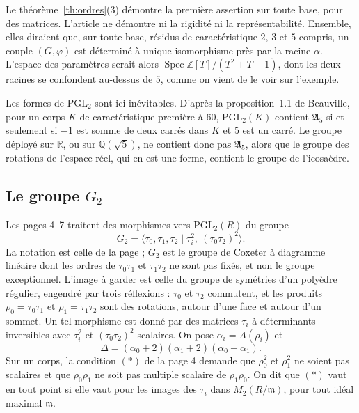 \documentclass[11pt,a4paper]{amsart}
\theoremstyle{definition}
\theoremstyle{plain}
\theoremstyle{remark}
\theoremstyle{plain}
\newcommand{\Z}{\mathbb Z}
\newcommand{\Q}{\mathbb Q}
\newcommand{\PGL}{\mathrm{PGL}_2}
\newcommand{\Spec}{\operatorname{Spec}}
\begin{document}
Le théorème~\ref{th:ordres}(3) démontre la première assertion sur toute base, pour des matrices. L'article ne démontre ni la rigidité ni la représentabilité. Ensemble, elles diraient que, sur toute base, résidus de caractéristique $2$, $3$ et $5$ compris, un couple $(G, \varphi)$ est déterminé à unique isomorphisme près par la racine $\alpha$. L'espace des paramètres serait alors $\Spec\Z[T]/(T^2 + T - 1)$, dont les deux racines se confondent au-dessus de $5$, comme on vient de le voir sur l'exemple.

Les formes de $\PGL$ sont ici inévitables. D'après la proposition~1.1 de Beauville, pour un corps $K$ de caractéristique première à $60$, $\PGL(K)$ contient $\mathfrak A_5$ si et seulement si $-1$ est somme de deux carrés dans $K$ et $5$ est un carré. Le groupe déployé sur $\mathbb R$, ou sur $\Q(\sqrt5)$, ne contient donc pas $\mathfrak A_5$, alors que le groupe des rotations de l'espace réel, qui en est une forme, contient le groupe de l'icosaèdre.

\subsection{Le groupe \texorpdfstring{$G_2$}{G2}}

Les pages 4--7 traitent des morphismes vers $\PGL(R)$ du groupe
\[
G_2 = \langle\tau_0, \tau_1, \tau_2 \mid \tau_i^2,\ (\tau_0\tau_2)^2\rangle.
\]
La notation est celle de la page ; $G_2$ est le groupe de Coxeter à diagramme linéaire dont les ordres de $\tau_0\tau_1$ et $\tau_1\tau_2$ ne sont pas fixés, et non le groupe exceptionnel. L'image à garder est celle du groupe de symétries d'un polyèdre régulier, engendré par trois réflexions : $\tau_0$ et $\tau_2$ commutent, et les produits $\rho_0 = \tau_0\tau_1$ et $\rho_1 = \tau_1\tau_2$ sont des rotations, autour d'une face et autour d'un sommet. Un tel morphisme est donné par des matrices $\tau_i$ à déterminants inversibles avec $\tau_i^2$ et $(\tau_0\tau_2)^2$ scalaires. On pose $\alpha_i = A(\rho_i)$ et
\[
\Delta = (\alpha_0 + 2)(\alpha_1 + 2)(\alpha_0 + \alpha_1).
\]
Sur un corps, la condition $(*)$ de la page 4 demande que $\rho_0^2$ et $\rho_1^2$ ne soient pas scalaires et que $\rho_0\rho_1$ ne soit pas multiple scalaire de $\rho_1\rho_0$. On dit que $(*)$ vaut en tout point si elle vaut pour les images des $\tau_i$ dans $M_2(R/\mathfrak m)$, pour tout idéal maximal $\mathfrak m$.
\end{document}
